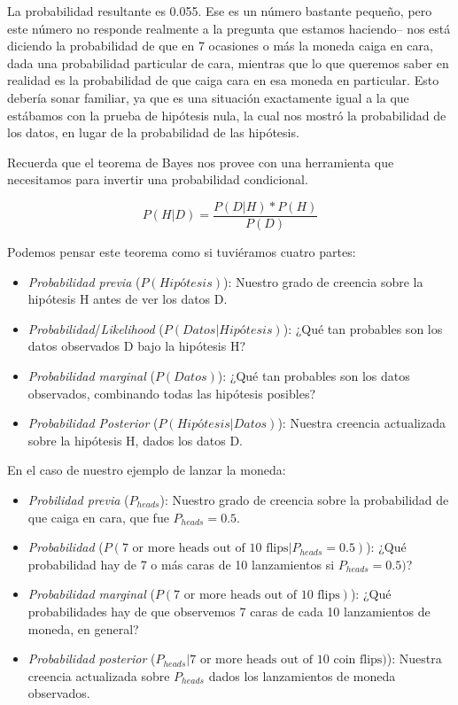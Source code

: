 \documentclass[
  12pt,
]{book}
\providecommand{\tightlist}{%
  \setlength{\itemsep}{0pt}\setlength{\parskip}{0pt}}
\begin{document}
La probabilidad resultante es 0.055. Ese es un número bastante pequeño, pero este número no responde realmente a la pregunta que estamos haciendo-- nos está diciendo la probabilidad de que en 7 ocasiones o más la moneda caiga en cara, dada una probabilidad particular de cara, mientras que lo que queremos saber en realidad es la probabilidad de que caiga cara en esa moneda en particular. Esto debería sonar familiar, ya que es una situación exactamente igual a la que estábamos con la prueba de hipótesis nula, la cual nos mostró la probabilidad de los datos, en lugar de la probabilidad de las hipótesis.

Recuerda que el teorema de Bayes nos provee con una herramienta que necesitamos para invertir una probabilidad condicional.

\[
P(H|D) = \frac{P(D|H)*P(H)}{P(D)}
\]

Podemos pensar este teorema como si tuviéramos cuatro partes:

\begin{itemize}
\tightlist
\item
  \emph{Probabilidad previa} (\(P(Hipótesis)\)): Nuestro grado de creencia sobre la hipótesis H antes de ver los datos D.
\item
  \emph{Probabilidad}/\emph{Likelihood} (\(P(Datos|Hipótesis)\)): ¿Qué tan probables son los datos observados D bajo la hipótesis H?
\item
  \emph{Probabilidad marginal} (\(P(Datos)\)): ¿Qué tan probables son los datos observados, combinando todas las hipótesis posibles?
\item
  \emph{Probabilidad Posterior} (\(P(Hipótesis|Datos)\)): Nuestra creencia actualizada sobre la hipótesis H, dados los datos D.
\end{itemize}

En el caso de nuestro ejemplo de lanzar la moneda:

\begin{itemize}
\tightlist
\item
  \emph{Probilidad previa} (\(P_ {heads}\)): Nuestro grado de creencia sobre la probabilidad de que caiga en cara, que fue \(P_ {heads} = 0.5\).
\item
  \emph{Probabilidad} (\(P(\text{7 or more heads out of 10 flips}|P_{heads}=0.5)\)): ¿Qué probabilidad hay de 7 o más caras de 10 lanzamientos si \(P_{heads}=0.5)\)?
\item
  \emph{Probabilidad marginal} (\(P(\text{7 or more heads out of 10 flips})\)): ¿Qué probabilidades hay de que observemos 7 caras de cada 10 lanzamientos de moneda, en general?
\item
  \emph{Probabilidad posterior} (\(P_{heads}|\text{7 or more heads out of 10 coin flips})\)): Nuestra creencia actualizada sobre \(P_{heads}\) dados los lanzamientos de moneda observados.
\end{itemize}
\end{document}
